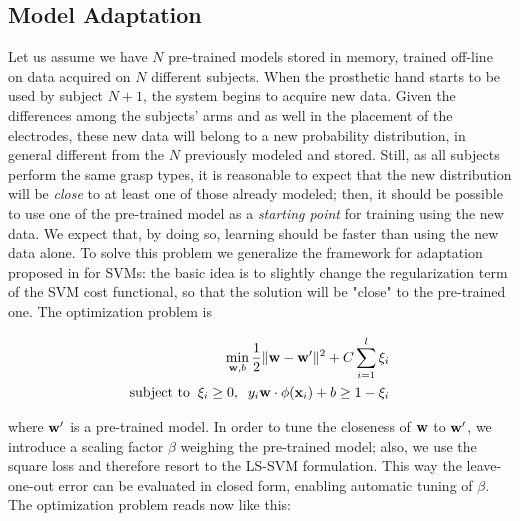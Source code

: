 \subsection{Model Adaptation}
\label{sec:adapt}

Let us assume we have $N$ pre-trained models stored in memory, trained
off-line on data acquired on $N$ different subjects. When the
prosthetic hand starts to be used by subject $N+1$, the system begins
to acquire new data. Given the differences among the subjects' arms
and as well in the placement of the electrodes, these new data will
belong to a new probability distribution, in general different from the $N$
previously modeled and stored. Still, as all subjects perform the
same grasp types, it is reasonable to expect that the new distribution
will be \emph{close} to at least one of those already modeled;
then, it should be possible to use one of the pre-trained model as a
\emph{starting point} for training using the new data.
We expect that, by doing so, learning should be faster
than using the new data alone. To solve this problem we
generalize the framework for adaptation proposed in \cite{YangYH07} for SVMs:
the basic idea is to slightly change the regularization term of the
SVM cost functional, so that the solution will be "close" to the pre-trained
one. The optimization problem is \cite{YangYH07}

\begin{align}
  \min_{\mathbf{w},b} \frac{1}{2} \|\mathbf{w}- \mathbf{w}'\|^2 + C \sum_{i=1}^l \xi_i \nonumber \\
  \mbox{subject to} \;\;
  \xi_i \geq 0,\;\; y_i \mathbf{w} \cdot \phi(\mathbf{x}_i) + b \geq 1-\xi_i
  \label{eq:opt_prob_orig}
\end{align}

\noindent where $\mathbf{w}'$ is a pre-trained model.
In order to tune the closeness of $\mathbf{w}$ to $\mathbf{w}'$, we introduce a scaling factor
$\beta$ weighing the pre-trained model; also, we use the square loss and therefore
resort to the LS-SVM formulation. This way the leave-one-out error can be evaluated
in closed form, enabling automatic tuning of $\beta$. The optimization problem
reads now like this:


